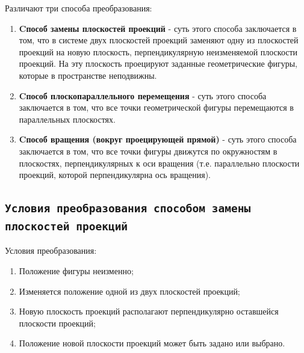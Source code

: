 Различают три способа преобразования:
\begin {enumerate}

\item {\bf Cпособ замены плоскостей проекций} - суть этого способа заключается в том, что в системе двух плоскостей проекций заменяют одну из плоскостей проекций на новую плоскость, перпендикулярную
неизменяемой плоскости проекций. На эту плоскость проецируют заданные
геометрические фигуры, которые в пространстве неподвижны.


\item {\bf Cпособ плоскопараллельного перемещения} - суть этого способа заключается в том, что все точки геометрической фигуры перемещаются в
параллельных плоскостях.


\item {\bf Cпособ вращения (вокруг проецирующей прямой)} - суть этого способа заключается в том, что все точки фигуры движутся по окружностям в плоскостях, перпендикулярных к оси вращения (т.е. параллельно плоскости проекций, которой перпендикулярна ось вращения).


\end {enumerate}




\newpage
\subsection{\texttt{Условия преобразования способом замены плоскостей проекций}}

\begin{myquote}
    
\end{myquote}

Условия преобразования:
\begin{enumerate}
    \item Положение фигуры неизменно;
    \item Изменяется положение одной из двух плоскостей проекций;
    \item Новую плоскость проекций располагают перпендикулярно оставшейся плоскости проекций;
    \item Положение новой плоскости проекций может быть задано или выбрано.
\end{enumerate}

